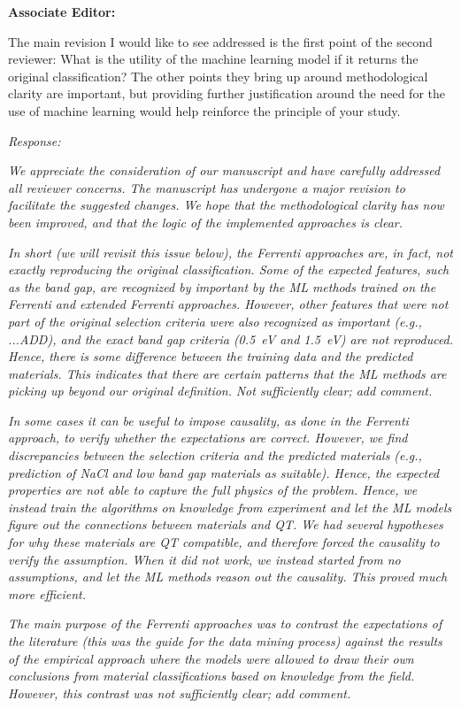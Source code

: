 \documentclass[11pt, a4paper]{letter} %
\begin{document}
\noindent
\textbf{Associate Editor:}

The main revision I would like to see addressed is the first point of the second reviewer: What is the utility of the machine learning model if it returns the original classification? The other points they bring up around methodological clarity are important, but providing further justification around the need for the use of machine learning would help reinforce the principle of your study. 


\textit{Response: }

\textit{We appreciate the consideration of our manuscript and have carefully addressed all reviewer concerns. The manuscript has undergone a major revision to facilitate the suggested changes. We hope that the methodological clarity has now been improved, and that the logic of the implemented approaches is clear. } 

\textit{In short (we will revisit this issue below), the Ferrenti approaches are, in fact, not exactly reproducing the original classification. Some of the expected features, such as the band gap, are recognized by important by the ML methods trained on the Ferrenti and extended Ferrenti approaches. However, other features that were not part of the original selection criteria were also recognized as important (e.g., ...ADD), and the exact band gap criteria (0.5~eV and 1.5~eV) are not reproduced. Hence, there is some difference between the training data and the predicted materials. This indicates that there are certain patterns that the ML methods are picking up beyond our original definition. } 
\textit{Not sufficiently clear; add comment. }

\textit{In some cases it can be useful to impose causality, as done in the Ferrenti approach, to verify whether the expectations are correct. However, we find discrepancies between the selection criteria and the predicted materials (e.g., prediction of NaCl and low band gap materials as suitable). Hence, the expected properties are not able to capture the full physics of the problem. Hence, we instead train the algorithms on knowledge from experiment and let the ML models figure out the connections between materials and QT. We had several hypotheses for why these materials are QT compatible, and therefore forced the causality to verify the assumption. When it did not work, we instead started from no assumptions, and let the ML methods reason out the causality. This proved much more efficient. } 

\textit{The main purpose of the Ferrenti approaches was to contrast the expectations of the literature (this was the guide for the data mining process) against the results of the empirical approach where the models were allowed to draw their own conclusions from material classifications  based on knowledge from the field. However, this contrast was not sufficiently clear;} \textit{add comment. }
\end{document}
